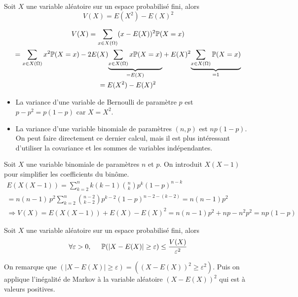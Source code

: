 \begin{prop}
Soit $X$ une variable aléatoire sur un espace probabilisé fini, alors
\begin{displaymath}
 V(X) = E(X^2) -E(X)^2
\end{displaymath}
\end{prop}
\begin{demo}
 \begin{multline*}
V(X)= \sum_{x\in X(\Omega)}(x-E(X))^2\mathbb{P}(X=x)\\
= \sum_{x\in X(\Omega)}x^2 \mathbb{P}(X=x) 
-2E(X)\underset{=E(X)}{\underbrace{\sum_{x\in X(\Omega)}x\mathbb{P}(X=x)}} 
+ E(X)^2\underset{=1}{\underbrace{\sum_{x\in X(\Omega)}\mathbb{P}(X=x)}} \\
=E(X^2)-E(X)^2
 \end{multline*}
\end{demo}
\newpage
\begin{exples}
 \begin{itemize}
  \item La variance d'une variable de Bernoulli de paramètre $p$ est $p-p^2 = p(1-p)$ car $X=X^2$.
  \item La variance d'une variable binomiale de paramètres $(n,p)$ est $n p(1-p)$. On peut faire directement ce dernier calcul, mais il est plus intéressant d'utiliser la covariance et les sommes de variables indépendantes.
 \end{itemize}
\end{exples}
\begin{demo}
  Soit $X$ une variable binomiale de paramètres $n$ et $p$. On introduit $X(X-1)$ pour simplifier les coefficients du binôme.
\begin{multline*}
E(X(X-1)) = \sum_{k=2}^{n}k(k-1)\binom{n}{k}p^k(1-p)^{n-k} \\
= n(n-1)\,p^2\sum_{k=2}^{n}\binom{n-2}{k-2}p^{k-2}(1-p)^{n-2-(k-2)} = n(n-1)p^2\\
\Rightarrow V(X) = E(X(X-1))+E(X)-E(X)^2 = n(n-1)p^2 + np -n^2p^2 = np(1-p)
\end{multline*}
\end{demo}
\newpage
{}
\begin{prop}
 Soit $X$ une variable aléatoire sur un espace probabilisé fini, alors
\begin{displaymath}
 \forall \varepsilon >0,\hspace{0.5cm}
\mathbb{P}(\left|X - E(X)\right|\geq \varepsilon) \leq \frac{V(X)}{\varepsilon^2}
\end{displaymath}
\end{prop}
\begin{demo}
 On remarque que $\left( \left|X - E(X)\right|\geq \varepsilon\right) = \left( (X-E(X))^2\geq \varepsilon^2\right)$. Puis on applique l'inégalité de Markov à la variable aléatoire $(X-E(X))^2$ qui est à valeurs positives.  
\end{demo}
\newpage
